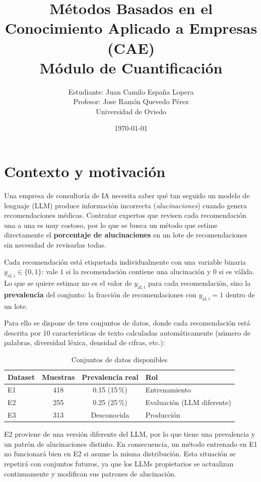 \documentclass[11pt,a4paper]{article}
\title{Métodos Basados en el Conocimiento Aplicado a Empresas (CAE)\\
       Módulo de Cuantificación}
\author{
Estudiante: Juan Camilo España Lopera\\
Profesor: Jose Ramón Quevedo Pérez\\[6pt]
Universidad de Oviedo
}
\date{\today}
\begin{document}
\maketitle


\section{Contexto y motivación}

Una empresa de consultoría de IA necesita saber qué tan seguido un modelo de
lenguaje (LLM) produce información incorrecta (\textit{alucinaciones}) cuando
genera recomendaciones médicas. Contratar expertos que revisen cada
recomendación una a una es muy costoso, por lo que se busca un método
que estime directamente el \textbf{porcentaje de alucinaciones} en un lote de
recomendaciones sin necesidad de revisarlas todas.

Cada recomendación está etiquetada individualmente con una variable binaria
$y_{\text{al},i} \in \{0, 1\}$: vale $1$ si la recomendación contiene una
alucinación y $0$ si es válida. Lo que se quiere estimar no es el valor de
$y_{\text{al},i}$ para cada recomendación, sino la \textbf{prevalencia} del
conjunto: la fracción de recomendaciones con $y_{\text{al},i} = 1$ dentro
de un lote.

Para ello se dispone de tres conjuntos de datos, donde cada recomendación
está descrita por 10 características de texto calculadas automáticamente
(número de palabras, diversidad léxica, densidad de cifras, etc.):

\begin{table}[H]
\centering
\caption{Conjuntos de datos disponibles}
\begin{tabular}{lccl}
\toprule
\textbf{Dataset} & \textbf{Muestras} & \textbf{Prevalencia real} & \textbf{Rol} \\
\midrule
E1 & 418 & 0.15 (15\,\%) & Entrenamiento \\
E2 & 255 & 0.25 (25\,\%) & Evaluación (LLM diferente) \\
E3 & 313 & Desconocida   & Producción \\
\bottomrule
\end{tabular}
\end{table}

E2 proviene de una versión diferente del LLM, por lo que tiene una prevalencia
y un patrón de alucinaciones distinto. En consecuencia, un método entrenado
en E1 no funcionará bien en E2 si asume la misma distribución. Esta situación
se repetirá con conjuntos futuros, ya que los LLMs propietarios se actualizan
continuamente y modifican sus patrones de alucinación.
\end{document}
